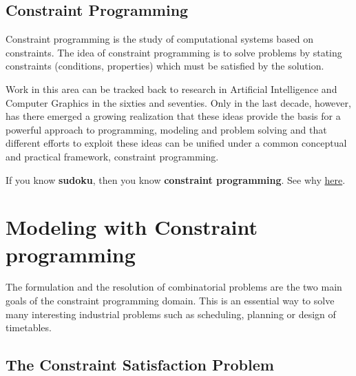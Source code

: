 \subsection{Constraint Programming}\label{introduction:constraintprogramming}\hypertarget{introduction:constraintprogramming}{}
Constraint programming is the study of computational systems based on constraints. The idea of constraint programming is to solve problems by stating constraints (conditions, properties) which must be satisfied by the solution.

Work in this area can be tracked back to research in Artificial Intelligence and Computer Graphics in the sixties and seventies. Only in the last decade, however, has there emerged a growing realization that these ideas provide the basis for a powerful approach to programming, modeling and problem solving and that different efforts to exploit these ideas can be unified under a common conceptual and practical framework, constraint programming. 

\begin{note}
If you know \textbf{sudoku}, then you know \textbf{constraint programming}. See why \hyperlink{sudokuandcp}{here}.
\end{note}


\section{Modeling with Constraint programming}\label{introduction:modelingwithconstraintprogramming}\hypertarget{introduction:modelingwithconstraintprogramming}{}
The formulation and the resolution of combinatorial problems are the two main goals of the constraint programming domain. This is an essential way to solve many interesting industrial problems such as scheduling, planning or design of timetables. 

\subsection{The Constraint Satisfaction Problem}\label{introduction:csp}\hypertarget{introduction:csp}{}

